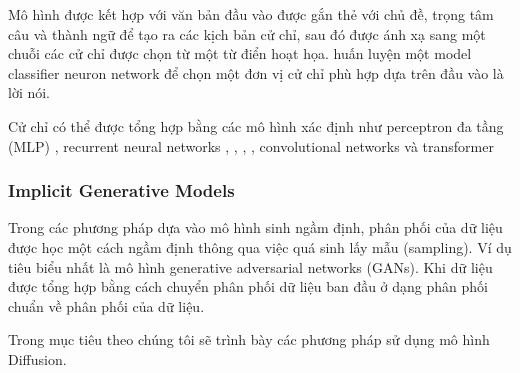 
Mô hình được kết hợp với văn bản đầu vào được gắn thẻ với chủ đề, trọng tâm câu và thành ngữ để tạo ra các kịch bản cử chỉ, sau đó được ánh xạ sang một chuỗi các cử chỉ được chọn từ một từ điển hoạt họa. \cite{chiu2015predicting} huấn luyện một model classifier neuron network để chọn một đơn vị cử chỉ phù hợp dựa trên đầu vào là lời nói. 

Cử chỉ có thể được tổng hợp bằng các mô hình xác định như perceptron đa tầng (MLP) \cite{kucherenko2020gesticulator}, recurrent neural networks \cite{bhattacharya2021speech2affectivegestures}, \cite{liu2022learning}, \cite{hasegawa2018evaluation}, \cite{yoon2020speech}, convolutional networks \cite{habibie2021learning} và transformer \cite{bhattacharya2021text2gestures} 


\subsubsection{Implicit Generative Models}

Trong các phương pháp dựa vào mô hình sinh ngầm định, phân phối của dữ liệu được học một cách ngầm định thông qua việc quá sinh lấy mẫu (sampling). Ví dụ tiêu biểu nhất là mô hình generative adversarial networks (GANs). Khi dữ liệu được tổng hợp bằng cách chuyển phân phối dữ liệu ban đầu ở dạng phân phối chuẩn về phân phối của dữ liệu.

Trong mục tiêu theo chúng tôi sẽ trình bày các phương pháp sử dụng mô hình Diffusion.






